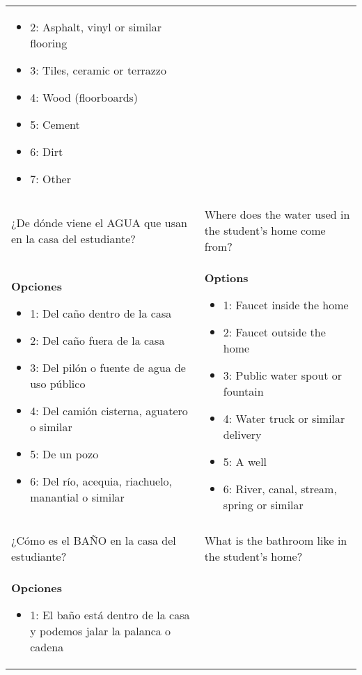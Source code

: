 \documentclass[11pt]{article}
\begin{document}
\begin{longtable}{@{}LL@{}}
\begin{itemize}[leftmargin=*]
\item 2: Asphalt, vinyl or similar flooring
\item 3: Tiles, ceramic or terrazzo
\item 4: Wood (floorboards)
\item 5: Cement
\item 6: Dirt
\item 7: Other\end{itemize} \\
\addlinespace[4pt]
 \\ 
¿De dónde viene el AGUA que usan en la casa del estudiante? & Where does the water used in the student's home come from? \\
\textbf{Opciones}\par\begin{itemize}[leftmargin=*]\item 1: Del caño dentro de la casa
\item 2: Del caño fuera de la casa
\item 3: Del pilón o fuente de agua de uso público
\item 4: Del camión cisterna, aguatero o similar
\item 5: De un pozo
\item 6: Del río, acequia, riachuelo, manantial o similar\end{itemize} & \textbf{Options}\par\begin{itemize}[leftmargin=*]\item 1: Faucet inside the home
\item 2: Faucet outside the home
\item 3: Public water spout or fountain
\item 4: Water truck or similar delivery
\item 5: A well
\item 6: River, canal, stream, spring or similar\end{itemize} \\
\addlinespace[4pt]
 \\ 
¿Cómo es el BAÑO en la casa del estudiante? & What is the bathroom like in the student's home? \\
\textbf{Opciones}\par\begin{itemize}[leftmargin=*]\item 1: El baño está dentro de la casa y podemos jalar la palanca o cadena

\end{itemize}
\end{longtable}
\end{document}
